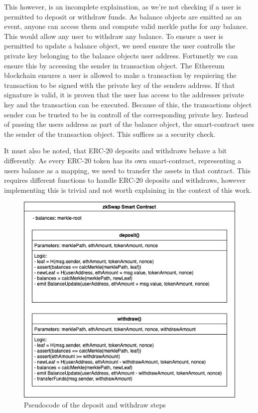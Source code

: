 \documentclass[../../thesis.tex]{subfiles}
\begin{document}
This however, is an incomplete explaination, as we're not checking if a user is permitted to deposit or withdraw funds. As balance objects are emitted as an event, anyone can access them and compute valid merkle paths for any balance. This would allow any user to withdraw any balance. To ensure a user is permitted to update a balance object, we need ensure the user controlls the private key belonging to the balance objects user address. Fortunetly we can ensure this by accessing the sender in transaction object. The Ethereum blockchain ensures a user is allowed to make a transaction by requiering the transaction to be signed with the private key of the senders address. If that signature is valid, it is proven that the user has access to the addresses private key and the transaction can be executed. Because of this, the transactions object sender can be trusted to be in controll of the corresponding private key. Instead of passing the users address as part of the balance object, the smart-contract uses the sender of the transaction object. This suffices as a security check.

It must also be noted, that ERC-20 deposits and withdraws behave a bit differently. As every ERC-20 token has its own smart-contract, representing a users balance as a mapping, we need to transfer the assets in that contract. This requires different functions to handle ERC-20 deposits and withdraws, however implementing this is trivial and not worth explaining in the context of this work. 

\begin{figure}[h]
    \centerline{\includegraphics[totalheight=8cm]{diagrams/deposit_withdraw.png}}
    \caption{Pseudocode of the deposit and withdraw steps}
    \label{fig:dep_with}
\end{figure}
\end{document}
